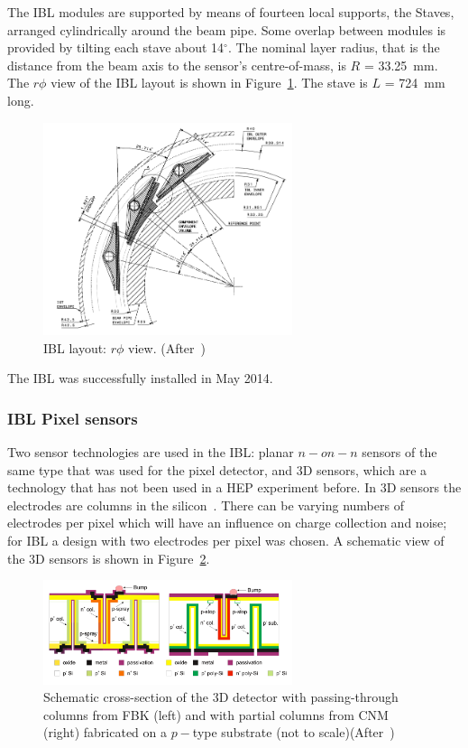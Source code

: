 The IBL modules are supported by means of fourteen local supports, the Staves, arranged cylindrically
around the beam pipe. Some overlap between modules is provided by tilting each stave
about 14$^{\circ}$. The nominal layer radius, that is the distance from the beam axis to the sensor's
centre-of-mass, is $R$ = 33.25~mm. The $r\phi$ view of the IBL layout is shown in Figure~\ref{fig:IBLrphi}. The stave is $L$ = 724~mm long. 

\begin{figure}[!htpb]
\centering
\includegraphics[width=0.65\textwidth]{IBLrphi.png}
\caption{\label{fig:IBLrphi}IBL layout: $r\phi$ view. (After~\cite{IBLTDR})}
\end{figure}
The IBL was successfully installed in May 2014.

\subsubsection{IBL Pixel sensors}
Two sensor technologies are used in the IBL: planar $n-on-n$ sensors of the same type
that was used for the pixel detector, and 3D sensors, which are a 
technology that has not
been used in a HEP experiment before. In 3D sensors the electrodes are columns in
the silicon~\cite{PARKER1997328}. There can be varying numbers of electrodes per pixel which will 
have an influence on charge collection and noise; for IBL a design with two electrodes per pixel was chosen. A schematic view of the 3D sensors is shown in Figure~\ref{fig:IBLtredi}.
\begin{figure}[!htpb]
\centering
\includegraphics[width=0.65\textwidth]{tredi.png}
\caption{\label{fig:IBLtredi} Schematic cross-section of the 3D detector with passing-through columns from FBK (left) and
with partial columns from CNM (right) fabricated on a $p-$type substrate (not to scale)(After~\cite{Darbo:2014kma})}
\end{figure}



